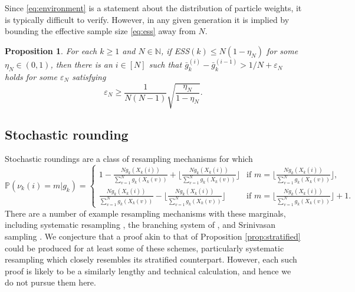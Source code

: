 \documentclass[a4paper,11pt]{article}
\newtheorem{prop}{Proposition}
\theoremstyle{definition}
\newcommand{\bbP}{\mathbb{P}}
\begin{document}
Since \eqref{eq:environment} is a statement about the distribution of particle weights, it is typically difficult to verify.
However, in any given generation it is implied by bounding the effective sample size \eqref{eq:ess} away from $N$.

\begin{prop}\label{prop:environment}
For each $k \geq 1$ and $N \in \mathbb{N}$, if ESS$(k) \leq N (1 - \eta_N)$ for some $\eta_N \in (0, 1)$, then there is an $i \in [N]$ such that $\bar{ g }_k^{ ( i ) } - \bar{g}_k^{ ( i - 1 ) } > 1 / N + \varepsilon_N$ holds for some $\varepsilon_N$ satisfying
\begin{equation*}
\varepsilon_N \geq \frac{1}{N(N - 1)} \sqrt{\frac{\eta_N}{1 - \eta_N}}.
\end{equation*}
\end{prop}

\subsection{Stochastic rounding}

Stochastic roundings are a class of resampling mechanisms for which
\begin{equation*}
\bbP( \nu_k( i ) = m | g_k ) =
\begin{cases}
1 - \frac{ N g_k( X_k( i ) ) }{ \sum_{ v = 1 }^N g_k( X_k( v ) ) } + \Big\lfloor \frac{ N g_k( X_k( i ) ) }{ \sum_{ v = 1 }^N g_k( X_k( v ) ) } \Big\rfloor &\text{if } m = \Big\lfloor \frac{ N g_k( X_k( i ) ) }{ \sum_{ v = 1 }^N g_k( X_k( v ) ) } \Big \rfloor, \\
\frac{ N g_k( X_k( i ) ) }{ \sum_{ v = 1 }^N g_k( X_k( v ) ) } - \Big\lfloor \frac{ N g_k( X_k( i ) ) }{ \sum_{ v = 1 }^N g_k( X_k( v ) ) } \Big\rfloor &\text{if } m = \Big\lfloor \frac{ N g_k( X_k( i ) ) }{ \sum_{ v = 1 }^N g_k( X_k( v ) ) } \Big\rfloor + 1.
\end{cases}
\end{equation*}
There are a number of example resampling mechanisms with these marginals, including systematic resampling \cite{carpenter1999, whitley1994}, the branching system of \cite{crisan1997}, and Srinivasan sampling \cite{gerber2017}.
We conjecture that a proof akin to that of Proposition \ref{prop:stratified} could be produced for at least some of these schemes, particularly systematic resampling which closely resembles its stratified counterpart.
However, each such proof is likely to be a similarly lengthy and technical calculation, and hence we do not pursue them here.
\end{document}
